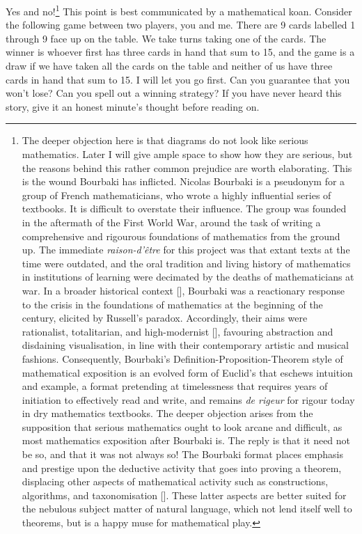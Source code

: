 Yes and no!\footnote{The deeper objection here is that diagrams do not look like serious mathematics. Later I will give ample space to show how they are serious, but the reasons behind this rather common prejudice are worth elaborating. This is the wound Bourbaki has inflicted. Nicolas Bourbaki is a pseudonym for a group of French mathematicians, who wrote a highly influential series of textbooks. It is difficult to overstate their influence. The group was founded in the aftermath of the First World War, around the task of writing a comprehensive and rigourous foundations of mathematics from the ground up. The immediate \emph{raison-d'\^{e}tre} for this project was that extant texts at the time were outdated, and the oral tradition and living history of mathematics in institutions of learning were decimated by the deaths of mathematicians at war. In a broader historical context [], Bourbaki was a reactionary response to the crisis in the foundations of mathematics at the beginning of the century, elicited by Russell's paradox. Accordingly, their aims were rationalist, totalitarian, and high-modernist [], favouring abstraction and disdaining visualisation, in line with their contemporary artistic and musical fashions. Consequently, Bourbaki's Definition-Proposition-Theorem style of mathematical exposition is an evolved form of Euclid's that eschews intuition and example, a format pretending at timelessness that requires years of initiation to effectively read and write, and remains \emph{de rigeur} for rigour today in dry mathematics textbooks. The deeper objection arises from the supposition that serious mathematics ought to look arcane and difficult, as most mathematics exposition after Bourbaki is. The reply is that it need not be so, and that it was not always so! The Bourbaki format places emphasis and prestige upon the deductive activity that goes into proving a theorem, displacing other aspects of mathematical activity such as constructions, algorithms, and taxonomisation []. These latter aspects are better suited for the nebulous subject matter of natural language, which not lend itself well to theorems, but is a happy muse for mathematical play.} This point is best communicated by a mathematical koan. Consider the following game between two players, you and me. There are 9 cards labelled 1 through 9 face up on the table. We take turns taking one of the cards. The winner is whoever first has three cards in hand that sum to 15, and the game is a draw if we have taken all the cards on the table and neither of us have three cards in hand that sum to 15. I will let you go first. Can you guarantee that you won't lose? Can you spell out a winning strategy? If you have never heard this story, give it an honest minute's thought before reading on.\\

